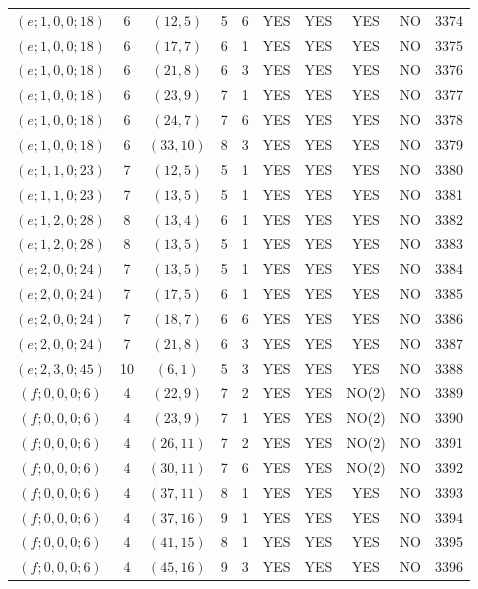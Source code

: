 \begin{longtable}{|c|c|c|c|c|c|c|c|c|c|}
$(e; 1, 0, 0; 18)$ & 6 & $(12, 5)$ & 5 & 6 & YES & YES & YES & NO & 3374\\
$(e; 1, 0, 0; 18)$ & 6 & $(17, 7)$ & 6 & 1 & YES & YES & YES & NO & 3375\\
$(e; 1, 0, 0; 18)$ & 6 & $(21, 8)$ & 6 & 3 & YES & YES & YES & NO & 3376\\
$(e; 1, 0, 0; 18)$ & 6 & $(23, 9)$ & 7 & 1 & YES & YES & YES & NO & 3377\\
$(e; 1, 0, 0; 18)$ & 6 & $(24, 7)$ & 7 & 6 & YES & YES & YES & NO & 3378\\
$(e; 1, 0, 0; 18)$ & 6 & $(33, 10)$ & 8 & 3 & YES & YES & YES & NO & 3379\\
$(e; 1, 1, 0; 23)$ & 7 & $(12, 5)$ & 5 & 1 & YES & YES & YES & NO & 3380\\
$(e; 1, 1, 0; 23)$ & 7 & $(13, 5)$ & 5 & 1 & YES & YES & YES & NO & 3381\\
$(e; 1, 2, 0; 28)$ & 8 & $(13, 4)$ & 6 & 1 & YES & YES & YES & NO & 3382\\
$(e; 1, 2, 0; 28)$ & 8 & $(13, 5)$ & 5 & 1 & YES & YES & YES & NO & 3383\\
$(e; 2, 0, 0; 24)$ & 7 & $(13, 5)$ & 5 & 1 & YES & YES & YES & NO & 3384\\
$(e; 2, 0, 0; 24)$ & 7 & $(17, 5)$ & 6 & 1 & YES & YES & YES & NO & 3385\\
$(e; 2, 0, 0; 24)$ & 7 & $(18, 7)$ & 6 & 6 & YES & YES & YES & NO & 3386\\
$(e; 2, 0, 0; 24)$ & 7 & $(21, 8)$ & 6 & 3 & YES & YES & YES & NO & 3387\\
$(e; 2, 3, 0; 45)$ & 10 & $(6, 1)$ & 5 & 3 & YES & YES & YES & NO & 3388\\
$(f; 0, 0, 0; 6)$ & 4 & $(22, 9)$ & 7 & 2 & YES & YES & NO(2) & NO & 3389\\
$(f; 0, 0, 0; 6)$ & 4 & $(23, 9)$ & 7 & 1 & YES & YES & NO(2) & NO & 3390\\
$(f; 0, 0, 0; 6)$ & 4 & $(26, 11)$ & 7 & 2 & YES & YES & NO(2) & NO & 3391\\
$(f; 0, 0, 0; 6)$ & 4 & $(30, 11)$ & 7 & 6 & YES & YES & NO(2) & NO & 3392\\
$(f; 0, 0, 0; 6)$ & 4 & $(37, 11)$ & 8 & 1 & YES & YES & YES & NO & 3393\\
$(f; 0, 0, 0; 6)$ & 4 & $(37, 16)$ & 9 & 1 & YES & YES & YES & NO & 3394\\
$(f; 0, 0, 0; 6)$ & 4 & $(41, 15)$ & 8 & 1 & YES & YES & YES & NO & 3395\\
$(f; 0, 0, 0; 6)$ & 4 & $(45, 16)$ & 9 & 3 & YES & YES & YES & NO & 3396\\

\end{longtable}
